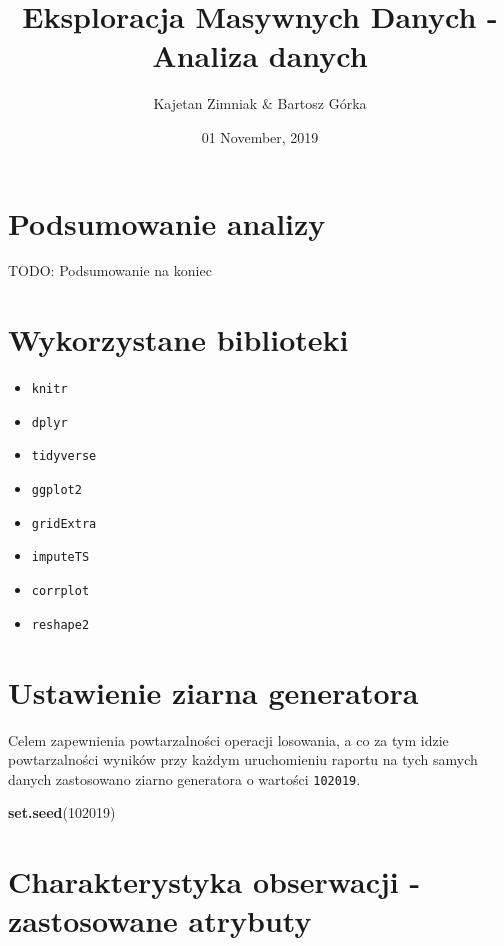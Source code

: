 \documentclass[]{article}
\title{Eksploracja Masywnych Danych - Analiza danych}
\author{Kajetan Zimniak \& Bartosz Górka}
\date{01 November, 2019}
\newenvironment{Shaded}{\begin{snugshade}}{\end{snugshade}}
\newcommand{\DecValTok}[1]{\textcolor[rgb]{0.00,0.00,0.81}{#1}}
\newcommand{\KeywordTok}[1]{\textcolor[rgb]{0.13,0.29,0.53}{\textbf{#1}}}
\newcommand{\NormalTok}[1]{#1}
\providecommand{\tightlist}{%
  \setlength{\itemsep}{0pt}\setlength{\parskip}{0pt}}
\begin{document}
\maketitle

{
\setcounter{tocdepth}{2}
\tableofcontents
}
\hypertarget{podsumowanie-analizy}{%
\section{Podsumowanie analizy}\label{podsumowanie-analizy}}

TODO: Podsumowanie na koniec

\hypertarget{wykorzystane-biblioteki}{%
\section{Wykorzystane biblioteki}\label{wykorzystane-biblioteki}}

\begin{itemize}
\tightlist
\item
  \texttt{knitr}
\item
  \texttt{dplyr}
\item
  \texttt{tidyverse}
\item
  \texttt{ggplot2}
\item
  \texttt{gridExtra}
\item
  \texttt{imputeTS}
\item
  \texttt{corrplot}
\item
  \texttt{reshape2}
\end{itemize}

\hypertarget{ustawienie-ziarna-generatora}{%
\section{Ustawienie ziarna
generatora}\label{ustawienie-ziarna-generatora}}

Celem zapewnienia powtarzalności operacji losowania, a co za tym idzie
powtarzalności wyników przy każdym uruchomieniu raportu na tych samych
danych zastosowano ziarno generatora o wartości \texttt{102019}.

\begin{Shaded}
\begin{Highlighting}[]
\KeywordTok{set.seed}\NormalTok{(}\DecValTok{102019}\NormalTok{)}
\end{Highlighting}
\end{Shaded}

\hypertarget{charakterystyka-obserwacji---zastosowane-atrybuty}{%
\section{Charakterystyka obserwacji - zastosowane
atrybuty}\label{charakterystyka-obserwacji---zastosowane-atrybuty}}
\end{document}
